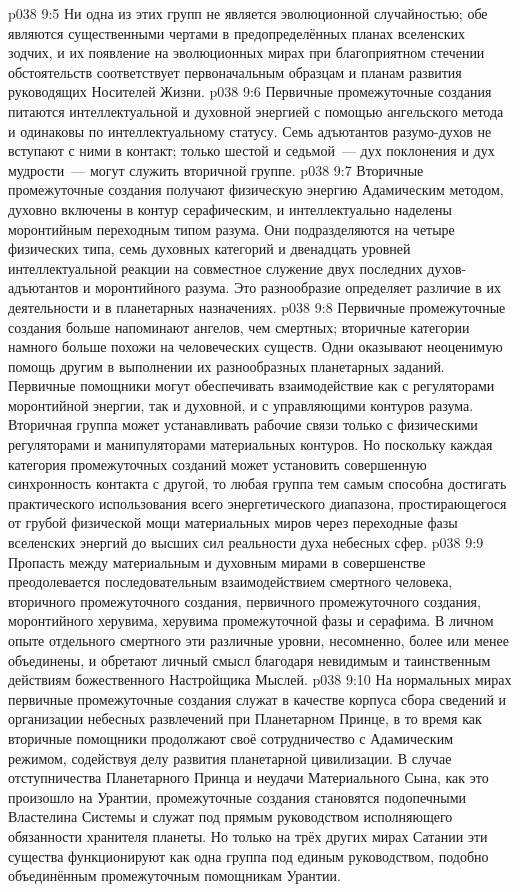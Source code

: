 \vs p038 9:5 \pc Ни одна из этих групп не является эволюционной случайностью; обе являются существенными чертами в предопределённых планах вселенских зодчих, и их появление на эволюционных мирах при благоприятном стечении обстоятельств соответствует первоначальным образцам и планам развития руководящих Носителей Жизни.
\vs p038 9:6 Первичные промежуточные создания питаются интеллектуальной и духовной энергией с помощью ангельского метода и одинаковы по интеллектуальному статусу. Семь адъютантов разумо\hyp{}духов не вступают с ними в контакт; только шестой и седьмой~--- дух поклонения и дух мудрости~--- могут служить вторичной группе.
\vs p038 9:7 Вторичные промежуточные создания получают физическую энергию Адамическим методом, духовно включены в контур серафическим, и интеллектуально наделены моронтийным переходным типом разума. Они подразделяются на четыре физических типа, семь духовных категорий и двенадцать уровней интеллектуальной реакции на совместное служение двух последних духов\hyp{}адъютантов и моронтийного разума. Это разнообразие определяет различие в их деятельности и в планетарных назначениях.
\vs p038 9:8 Первичные промежуточные создания больше напоминают ангелов, чем смертных; вторичные категории намного больше похожи на человеческих существ. Одни оказывают неоценимую помощь другим в выполнении их разнообразных планетарных заданий. Первичные помощники могут обеспечивать взаимодействие как с регуляторами моронтийной энергии, так и духовной, и с управляющими контуров разума. Вторичная группа может устанавливать рабочие связи только с физическими регуляторами и манипуляторами материальных контуров. Но поскольку каждая категория промежуточных созданий может установить совершенную синхронность контакта с другой, то любая группа тем самым способна достигать практического использования всего энергетического диапазона, простирающегося от грубой физической мощи материальных миров через переходные фазы вселенских энергий до высших сил реальности духа небесных сфер.
\vs p038 9:9 Пропасть между материальным и духовным мирами в совершенстве преодолевается последовательным взаимодействием смертного человека, вторичного промежуточного создания, первичного промежуточного создания, моронтийного херувима, херувима промежуточной фазы и серафима. В личном опыте отдельного смертного эти различные уровни, несомненно, более или менее объединены, и обретают личный смысл благодаря невидимым и таинственным действиям божественного Настройщика Мыслей.
\vs p038 9:10 \pc На нормальных мирах первичные промежуточные создания служат в качестве корпуса сбора сведений и организации небесных развлечений при Планетарном Принце, в то время как вторичные помощники продолжают своё сотрудничество с Адамическим режимом, содействуя делу развития планетарной цивилизации. В случае отступничества Планетарного Принца и неудачи Материального Сына, как это произошло на Урантии, промежуточные создания становятся подопечными Властелина Системы и служат под прямым руководством исполняющего обязанности хранителя планеты. Но только на трёх других мирах Сатании эти существа функционируют как одна группа под единым руководством, подобно объединённым промежуточным помощникам Урантии.
